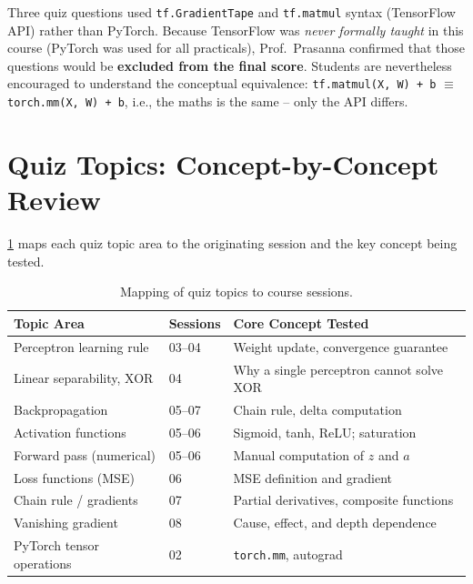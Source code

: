 \documentclass[12pt,a4paper]{article}
\begin{document}
\begin{warningbox}
  Three quiz questions used \texttt{tf.GradientTape} and
  \texttt{tf.matmul} syntax (TensorFlow API) rather than PyTorch.
  Because TensorFlow was \emph{never formally taught} in this course
  (PyTorch was used for all practicals), Prof.\ Prasanna confirmed that
  those questions would be \textbf{excluded from the final score}.
  Students are nevertheless encouraged to understand the conceptual
  equivalence: \texttt{tf.matmul(X,~W)~+~b} $\equiv$
  \texttt{torch.mm(X,~W)~+~b}, i.e., the maths is the same -- only
  the API differs.
\end{warningbox}

\section{Quiz Topics: Concept-by-Concept Review}
\label{sec:quiz_topics}

\cref{tab:quiz_coverage} maps each quiz topic area to the originating
session and the key concept being tested.

\begin{table}[htbp]
  \centering
  \caption{Mapping of quiz topics to course sessions.}
  \label{tab:quiz_coverage}
  \begin{tabularx}{\linewidth}{llX}
    \toprule
    \textbf{Topic Area} & \textbf{Sessions} & \textbf{Core Concept Tested} \\
    \midrule
    Perceptron learning rule    & 03--04 & Weight update, convergence guarantee \\
    Linear separability, XOR    & 04     & Why a single perceptron cannot solve XOR \\
    Backpropagation             & 05--07 & Chain rule, delta computation \\
    Activation functions        & 05--06 & Sigmoid, tanh, ReLU; saturation \\
    Forward pass (numerical)    & 05--06 & Manual computation of $z$ and $a$ \\
    Loss functions (MSE)        & 06     & MSE definition and gradient \\
    Chain rule / gradients      & 07     & Partial derivatives, composite functions \\
    Vanishing gradient          & 08     & Cause, effect, and depth dependence \\
    PyTorch tensor operations   & 02     & \texttt{torch.mm}, autograd \\
    \bottomrule
  \end{tabularx}
\end{table}
\end{document}
